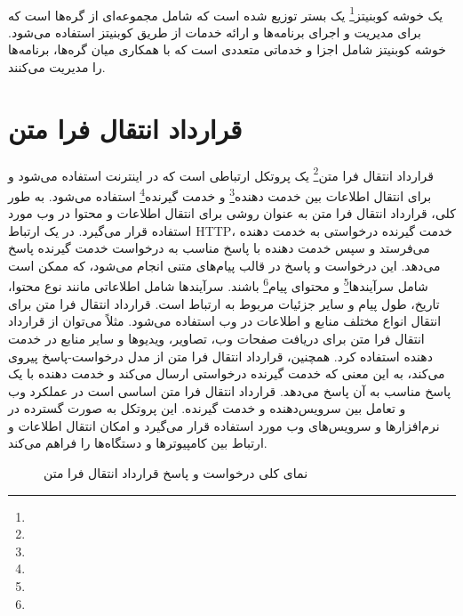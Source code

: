 \paragraph{}
{
    یک خوشه کوبنیتز\footnote{} یک بستر توزیع شده است که شامل مجموعه‌ای از گره‌ها است که برای مدیریت و اجرای برنامه‌ها و ارائه خدمات از طریق کوبنیتز استفاده می‌شود. خوشه کوبنیتز شامل اجزا و خدماتی متعددی است که با همکاری میان گره‌ها، برنامه‌ها را مدیریت می‌کنند.
}

\section{قرارداد انتقال فرا متن}
\label{sec:http}
\paragraph{}
{
    قرارداد انتقال فرا متن\footnote{} یک پروتکل ارتباطی است که در اینترنت استفاده می‌شود و برای انتقال اطلاعات بین خدمت دهنده‌\footnote{} و خدمت گیرنده\footnote{} استفاده می‌شود. به طور کلی، قرارداد انتقال فرا متن به عنوان روشی برای انتقال اطلاعات و محتوا در وب مورد استفاده قرار می‌گیرد. در یک ارتباط HTTP، خدمت گیرنده درخواستی به خدمت دهنده‌ می‌فرستد و سپس خدمت دهنده‌ با پاسخ مناسب به درخواست خدمت گیرنده پاسخ می‌دهد. این درخواست و پاسخ در قالب پیام‌های متنی انجام می‌شود، که ممکن است شامل سرآیندها\footnote{} و محتوای پیام\footnote{} باشند. سرآیندها شامل اطلاعاتی مانند نوع محتوا، تاریخ، طول پیام و سایر جزئیات مربوط به ارتباط است. قرارداد انتقال فرا متن برای انتقال انواع مختلف منابع و اطلاعات در وب استفاده می‌شود. مثلاً می‌توان از قرارداد انتقال فرا متن برای دریافت صفحات وب، تصاویر، ویدیوها و سایر منابع در خدمت دهنده‌ استفاده کرد. همچنین، قرارداد انتقال فرا متن از مدل درخواست-پاسخ پیروی می‌کند، به این معنی که خدمت گیرنده درخواستی ارسال می‌کند و خدمت دهنده‌ با یک پاسخ مناسب به آن پاسخ می‌دهد. قرارداد انتقال فرا متن اساسی است در عملکرد وب و تعامل بین سرویس‌دهنده و خدمت گیرنده. این پروتکل به صورت گسترده در نرم‌افزارها و سرویس‌های وب مورد استفاده قرار می‌گیرد و امکان انتقال اطلاعات و ارتباط بین کامپیوترها و دستگاه‌ها را فراهم می‌کند.
    \begin{figure}[H]
        \caption{نمای کلی درخواست و پاسخ قرارداد انتقال فرا متن}
        \label{fig:http}
    \end{figure}
}

